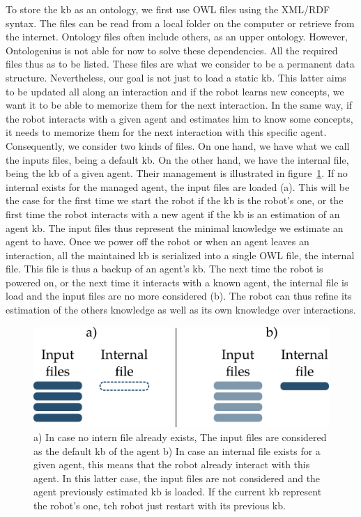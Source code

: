To store the \acrlong{kb} as an ontology, we first use OWL files using the XML/RDF syntax. The files can be read from a local folder on the computer or retrieve from the internet. Ontology files often include others, as an upper ontology. However, Ontologenius is not able for now to solve these dependencies. All the required files thus as to be listed. These files are what we consider to be a permanent data structure. Nevertheless, our goal is not just to load a static \acrlong{kb}. This latter aims to be updated all along an interaction and if the robot learns new concepts, we want it to be able to memorize them for the next interaction. In the same way, if the robot interacts with a given agent and estimates him to know some concepts, it needs to memorize them for the next interaction with this specific agent. Consequently, we consider two kinds of files. On one hand, we have what we call the inputs files, being a default \acrlong{kb}. On the other hand, we have the internal file, being the \acrlong{kb} of a given agent. Their management is illustrated in figure~\ref{fig:chap2_files}. If no internal exists for the managed agent, the input files are loaded (a). This will be the case for the first time we start the robot if the \acrlong{kb} is the robot's one, or the first time the robot interacts with a new agent if the \acrlong{kb} is an estimation of an agent \acrlong{kb}. The input files thus represent the minimal knowledge we estimate an agent to have. Once we power off the robot or when an agent leaves an interaction, all the maintained \acrlong{kb} is serialized into a single OWL file, the internal file. This file is thus a backup of an agent's \acrlong{kb}. The next time the robot is powered on, or the next time it interacts with a known agent, the internal file is load and the input files are no more considered (b). The robot can thus refine its estimation of the others knowledge as well as its own knowledge over interactions.

\begin{figure}[ht!]
\centering
\includegraphics[scale=0.6]{figures/chapter2/files.png}
\caption{\label{fig:chap2_files} a) In case no intern file already exists, The input files are considered as the default \acrlong{kb} of the agent b) In case an internal file exists for a given agent, this means that the robot already interact with this agent. In this latter case, the input files are not considered and the agent previously estimated \acrlong{kb} is loaded. If the current \acrlong{kb} represent the robot's one, teh robot just restart with its previous \acrlong{kb}.}
\end{figure}

